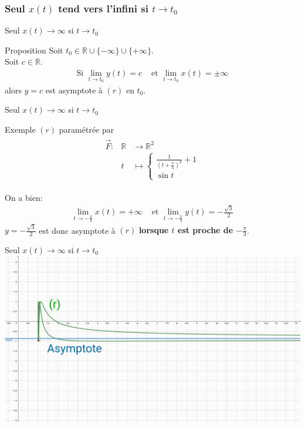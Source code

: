 \documentclass[14pt]{beamer}
\begin{document}
\subsubsection{Seul $x(t)$ tend vers l'infini si $t \to t_0$}
\begin{frame}{Seul $x(t)\to\infty$ si $t \to t_0$}
        \begin{alertblock}{Proposition}
                Soit $t_0\in\mathbb{R}\cup\{-\infty\}\cup\{+\infty\}$.\\
                Soit $c\in\mathbb{R}$.
                \begin{align*}
                        \text{Si } \lim_{t\to t_0}y(t)=c & \text{ et }\lim_{t\to t_0}x(t)=\pm\infty
                \end{align*}
                alors $y=c$ est asymptote à $(r)$ en $t_0$.
        \end{alertblock}
\end{frame}
\begin{frame}{Seul $x(t)\to\infty$ si $t \to t_0$}
        \begin{exampleblock}{Exemple $(r)$ paramétrée par}
        \begin{align*}
                \begin{array}{lll}
                        \vec{F}: & \mathbb{R} &\to \mathbb{R}^2\\
                        & t &\mapsto \left\{\begin{array}{l}\frac{1}{(t+\frac{\pi}{3})^2}+1\\\sin t\end{array}\right.
                \end{array}
        \end{align*}
        \end{exampleblock}
        On a bien:
        \begin{align*}
                \lim_{t\to -\frac{\pi}{3}}x(t)=+\infty & \text{ et }\lim_{t\to -\frac{\pi}{3}}y(t)=-\frac{\sqrt{3}}{2}
        \end{align*}
        $y=-\frac{\sqrt{3}}{2}$ est donc asymptote à $(r)$ \textbf{lorsque $t$ est proche de $-\frac{\pi}{3}$}.
\end{frame}

\begin{frame}{Seul $x(t)\to\infty$ si $t \to t_0$}
        \includegraphics[height=0.8\textheight]{images/Asymptote_02.png}
\end{frame}
\end{document}
